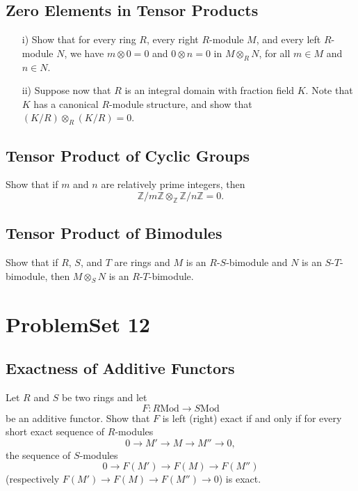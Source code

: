 \documentclass[lang=cn,11pt]{template}
\begin{document}
\section{Zero Elements in Tensor Products}
\begin{itemize}
    \item[i)] Show that for every ring \( R \), every right \( R \)-module \( M \), and every left \( R \)-module \( N \), we have \( m \otimes 0 = 0 \) and \( 0 \otimes n = 0 \) in \( M \otimes_R N \), for all \( m \in M \) and \( n \in N \).
    \item[ii)] Suppose now that \( R \) is an integral domain with fraction field \( K \). Note that \( K \) has a canonical \( R \)-module structure, and show that \( (K/R) \otimes_R (K/R) = 0 \).
\end{itemize}

\section{Tensor Product of Cyclic Groups}
Show that if \( m \) and \( n \) are relatively prime integers, then
\[
\mathbb{Z}/m\mathbb{Z} \otimes_{\mathbb{Z}} \mathbb{Z}/n\mathbb{Z} = 0.
\]

\section{Tensor Product of Bimodules}
Show that if \( R \), \( S \), and \( T \) are rings and \( M \) is an \( R \)-\( S \)-bimodule and \( N \) is an \( S \)-\( T \)-bimodule, then \( M \otimes_S N \) is an \( R \)-\( T \)-bimodule.







\chapter{ProblemSet 12}

\section{Exactness of Additive Functors}
Let \( R \) and \( S \) be two rings and let
\[
F : R\text{Mod} \rightarrow S\text{Mod}
\]
be an additive functor. Show that \( F \) is left (right) exact if and only if for every short exact sequence of \( R \)-modules
\[
0 \rightarrow M' \rightarrow M \rightarrow M'' \rightarrow 0,
\]
the sequence of \( S \)-modules
\[
0 \rightarrow F(M') \rightarrow F(M) \rightarrow F(M'')
\]
(respectively \( F(M') \rightarrow F(M) \rightarrow F(M'') \rightarrow 0 \)) is exact.
\end{document}
